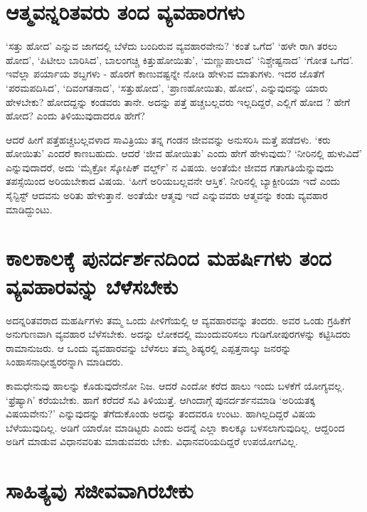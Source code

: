 \section*{ಆತ್ಮವನ್ನರಿತವರು ತಂದ ವ್ಯವಹಾರಗಳು}

`ಸತ್ತು ಹೋದ' ಎನ್ನುವ ಜಾಗದಲ್ಲಿ ಬೆಳೆದು ಬಂದಿರುವ ವ್ಯವಹಾರವೇನು? `ಕಂತೆ ಒಗೆದ' `ಹಳೇ ರಾಗಿ ತರಲು ಹೋದ', `ಪಿಟೀಲು ಬಾರಿಸಿದ', ಬಾಲಂಗಚ್ಚಿ ಕಿತ್ತುಹೋಯಿತು', `ಮಣ್ಣುಪಾಲಾದ' `ನಿಶ್ಚೇಷ್ಟನಾದ' `ಗೋತ ಒಗೆದ'. ಇವೆಲ್ಲಾ ಪರ್ಯಾಯ ಶಬ್ದಗಳು - ಹೊರಗೆ ಕಾಣುವಷ್ಟನ್ನೇ ನೋಡಿ ಹೇಳುವ ಮಾತುಗಳು. ಇದರ ಜೊತೆಗೆ `ಪರಮಪದಿಸಿದ', `ದಿವಂಗತನಾದ', `ಸತ್ತುಹೋದ', `ಪ್ರಾಣಹೋಯಿತು, ಹೋದ', ಎನ್ನುವುದನ್ನು ಯಾರು ಹೇಳಬೇಕು? ಹೋದದ್ದನ್ನು ಕಂಡವರು ತಾನೇ. ಅದನ್ನು ಪತ್ತೆ ಹಚ್ಚಬಲ್ಲವರು ಇಲ್ಲದಿದ್ದರೆ, ಎಲ್ಲಿಗೆ ಹೋದ ? ಹೇಗೆ ಹೋದ? ಎಂದು ತಿಳಿಯುವುದಾದರೂ ಹೇಗೆ?

ಆದರೆ ಹೀಗೆ ಪತ್ತೆಹಚ್ಚಬಲ್ಲವಳಾದ ಸಾವಿತ್ರಿಯು ತನ್ನ ಗಂಡನ ಜೀವವನ್ನು ಅನುಸರಿಸಿ ಮತ್ತೆ ಪಡೆದಳು. `ಕರು ಹೋಯಿತು' ಎಂದರೆ ಕಾಣಬಹುದು. ಆದರೆ `ಜೀವ ಹೋಯಿತು' ಎಂದು ಹೇಗೆ ಹೇಳುವುದು? `ನೀರಿನಲ್ಲಿ ಹುಳುವಿದೆ' ಎನ್ನುವುದಾದರೆ, ಅದು `ಮೈಕ್ರೋ ಸ್ಕೋಪಿಕ್ ವರ್ಲ್ಡ್' ನ ವಿಷಯ. ಅಂತೆಯೇ ಜೀವದ ಗತಾಗತಿಯೆನ್ನುವುದು ತಪಸ್ಸೆಯಿಂದ ಅರಿಯಬೇಕಾದ ವಿಷಯ. `ಹೀಗೆ ಅರಿಯಬಲ್ಲವನೇ ಆಸ್ತಿಕ'. ನೀರಿನಲ್ಲಿ ಬ್ಯಾಕ್ಟೀರಿಯಾ ಇದೆ ಎಂದು ಸೈನ್ಟಿಸ್ಟ್ ಆದವನು ಅರಿತು ಹೇಳುತ್ತಾನೆ. ಅಂತೆಯೇ ಆತ್ಮವು ಇದೆ ಎನ್ನುವವರು ಆತ್ಮವನ್ನು ಕಂಡು ವ್ಯವಹಾರ ಮಾಡಿದ್ದುಂಟು. 

\section*{ಕಾಲಕಾಲಕ್ಕೆ ಪುನರ್ದರ್ಶನದಿಂದ ಮಹರ್ಷಿಗಳು ತಂದ ವ್ಯವಹಾರವನ್ನು ಬೆಳೆಸಬೇಕು}

ಅದನ್ನರಿತವರಾದ ಮಹರ್ಷಿಗಳು ತಮ್ಮ ಒಂದು ಪೀಳಿಗೆಯಲ್ಲಿ ಆ ವ್ಯವಹಾರವನ್ನು ತಂದರು. ಅವರ ಒಂಡು ಗ್ರಹಿಕೆಗೆ ಅನುಗುಣವಾಗಿ ವ್ಯವಹಾರ ಬೆಳೆಸಬೇಕು. ಅದನ್ನು ಲೋಕದಲ್ಲಿ ಮುಂದುವರಿಸಲು ಗುಡಿಗೋಪುರಗಳನ್ನು ಕಟ್ಟಿಸಿದರು ರಾಮಾನುಜರು. ಆ ಒಂದು ವ್ಯವಹಾರವನ್ನು ಬೆಳೆಸಲು ತಮ್ಮ ಶಿಷ್ಯರಲ್ಲಿ ಎಪ್ಪತ್ತನಾಲ್ಕು  ಜನರನ್ನು ಸಿಂಹಾಸನಾಧೀಶ್ವರರನ್ನಾಗಿ ಮಾಡಿದರು.

ಕಾಮಧೇನುವು ಹಾಲನ್ನು ಕೊಡುವುದೇನೋ ನಿಜ. ಆದರೆ ಎಂದೋ ಕರೆದ ಹಾಲು ಇಂದು ಬಳಕೆಗೆ ಯೋಗ್ಯವಲ್ಲ. `ಫ್ರೆಷ್ಯಾಗಿ' ಕರೆಯಬೇಕು. ಹಾಗೆ ಕರೆದರೆ ಸವಿ ತಿಳಿಯುತ್ತೆ. ಆಗಿಂದಾಗ್ಗೆ ಪುನರ್ದರ್ಶನಮಾಡಿ `ಅರಿಯತಕ್ಕ ವಿಷಯವೇನು?' ಎನ್ನುವುದನ್ನು ತೆಗೆದುಕೊಂಡು ಅದನ್ನು ತಂದವರೂ ಉಂಟು. ಹಾಗಿಲ್ಲದಿದ್ದರೆ ವಿಷಯ ಬೆಳೆಯುವುದಿಲ್ಲ. ಅಡಿಗೆ ಯಾರೋ ಮಾಡಿಟ್ಟರು ಎಂದು ಅದನ್ನೆ ಎಲ್ಲಾ ಕಾಲಕ್ಕೂ ಬಳಸಲಾಗುವುದಿಲ್ಲ. ಆದ್ದರಿಂದ ಅಡಿಗೆ ಮಾಡುವ ವಿಧಾನವರಿತು ಮಾಡುವವರು ಬೇಕು. ವಿಧಾನವರಿಯದಿದ್ದರೆ ಉಪಯೋಗವಿಲ್ಲ.

\section*{ಸಾಹಿತ್ಯವು ಸಜೀವವಾಗಿರಬೇಕು}

